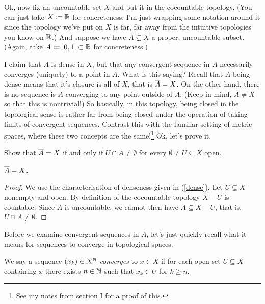 Ok, now fix an uncountable set $X$ and put it in the cocountable
topology. (You can just take $X \coloneqq \mathbb{R}$ for concreteness; I'm just
wrapping some notation around it since the topology we've put on $X$
is far, far away from the intuitive topologies you know on $\mathbb{R}$.)  And
suppose we have $A \subsetneq X$ a proper, uncountable subset. (Again,
take $A \coloneqq [0, 1] \subset \mathbb{R}$ for concreteness.)

\medskip
I claim that $A$ is dense in $X$, but that any convergent sequence in
$A$ necessarily converges (uniquely) to a point in $A$. What is this
saying? Recall that $A$ being dense means that it's closure is all of
$X$, that is $\overline A = X$. On the other hand, there is no sequence
is $A$ converging to any point outside of $A$. (Keep in mind, $A \ne
X$ so that this is nontrivial!) So basically, in this topology, being
closed in the topological sense is rather far from being closed under
the operation of taking limits of convergent sequences. Contrast this
with the familiar setting of metric spaces, where these two concepts
are the same!\footnote{See my notes from section I for a proof of
  this.} Ok, let's prove it.

\begin{exercise}
  \label{dense}
  Show that $\overline A = X$ if and only if $U \cap A \ne \emptyset$ for
  every $\emptyset \ne U \subseteq X$ open.
\end{exercise}

\begin{lemma}
  $\overline A = X$.
\end{lemma}

\begin{proof}
  We use the characterisation of denseness given in (\ref{dense}). Let
  $U \subseteq X$ nonempty and open. By definition of the cocountable
  topology $X - U$ is countable. Since $A$ is uncountable, we cannot
  then have $A \subseteq X - U$, that is, $U \cap A \ne \emptyset$.
\end{proof}

Before we examine convergent sequences in $A$, let's just quickly
recall what it means for sequences to converge in topological spaces.

\begin{definition}
  We say a sequence $(x_k) \in X^{\mathbb{N}}$ \textit{converges} to $x \in X$
  if for each open set $U \subseteq X$ containing $x$ there exists $n
  \in \mathbb{N}$ such that $x_k \in U$ for $k \ge n$.
\end{definition}

